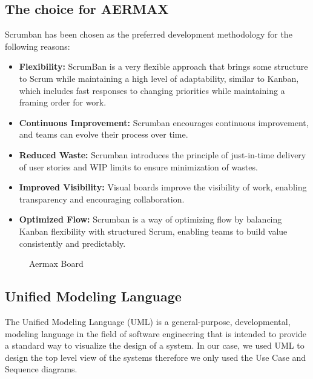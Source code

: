 \newpage
\subsection{The choice for AERMAX}
Scrumban has been chosen as the preferred development methodology for the following reasons:
\begin{itemize}
    \item \textbf{Flexibility:} ScrumBan is a very flexible approach that brings some structure to Scrum while maintaining a high level of adaptability, similar to Kanban, which includes fast responses to changing priorities while maintaining a framing order for work.
    \item \textbf{Continuous Improvement:} Scrumban encourages continuous improvement, and teams can evolve their process over time.
    \item \textbf{Reduced Waste:} Scrumban introduces the principle of just-in-time delivery of user stories and WIP limits to ensure minimization of wastes.
    \item \textbf{Improved Visibility:} Visual boards improve the visibility of work, enabling transparency and encouraging collaboration.
    \item \textbf{Optimized Flow:} Scrumban is a way of optimizing flow by balancing Kanban flexibility with structured Scrum, enabling teams to build value consistently and predictably.
\end{itemize}

\begin{figure}[H]
    \centering
    \caption{Aermax Board}
    \label{fig:armax-board}
\end{figure}
 
\newpage
\subsection{Unified Modeling Language}
The Unified Modeling Language (UML) is a general-purpose, developmental, modeling language in the field of software engineering that is intended to provide a standard way to visualize the design of a system. In our case, we used UML to design the top level view of the systems therefore we only used the Use Case and Sequence diagrams.



